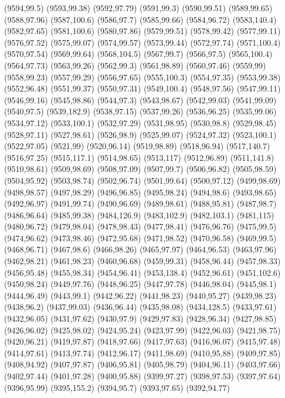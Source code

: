 (9594,99.5)
(9593,99.38)
(9592,97.79)
(9591,99.3)
(9590,99.51)
(9589,99.65)
(9588,97.96)
(9587,100.6)
(9586,97.7)
(9585,99.66)
(9584,96.72)
(9583,140.4)
(9582,97.65)
(9581,100.6)
(9580,97.86)
(9579,99.51)
(9578,99.42)
(9577,99.11)
(9576,97.52)
(9575,99.07)
(9574,99.57)
(9573,99.44)
(9572,97.74)
(9571,100.4)
(9570,97.54)
(9569,99.64)
(9568,104.5)
(9567,99.7)
(9566,97.5)
(9565,100.4)
(9564,97.73)
(9563,99.26)
(9562,99.3)
(9561,98.89)
(9560,97.46)
(9559,99)
(9558,99.23)
(9557,99.29)
(9556,97.65)
(9555,100.3)
(9554,97.35)
(9553,99.38)
(9552,96.48)
(9551,99.37)
(9550,97.31)
(9549,100.4)
(9548,97.56)
(9547,99.11)
(9546,99.16)
(9545,98.86)
(9544,97.3)
(9543,98.67)
(9542,99.03)
(9541,99.09)
(9540,97.5)
(9539,182.9)
(9538,97.15)
(9537,99.26)
(9536,96.25)
(9535,99.06)
(9534,97.12)
(9533,100.1)
(9532,97.29)
(9531,98.95)
(9530,98.8)
(9529,98.45)
(9528,97.11)
(9527,98.61)
(9526,98.9)
(9525,99.07)
(9524,97.32)
(9523,100.1)
(9522,97.05)
(9521,99)
(9520,96.14)
(9519,98.89)
(9518,96.94)
(9517,140.7)
(9516,97.25)
(9515,117.1)
(9514,98.65)
(9513,117)
(9512,96.89)
(9511,141.8)
(9510,98.61)
(9509,98.69)
(9508,97.09)
(9507,99.7)
(9506,96.82)
(9505,98.59)
(9504,95.92)
(9503,98.74)
(9502,96.74)
(9501,99.64)
(9500,97.12)
(9499,98.69)
(9498,98.57)
(9497,98.29)
(9496,96.85)
(9495,98.24)
(9494,98.6)
(9493,98.65)
(9492,96.97)
(9491,99.74)
(9490,96.69)
(9489,98.61)
(9488,95.81)
(9487,98.7)
(9486,96.64)
(9485,99.38)
(9484,126.9)
(9483,102.9)
(9482,103.1)
(9481,115)
(9480,96.72)
(9479,98.04)
(9478,98.43)
(9477,98.41)
(9476,96.76)
(9475,99.5)
(9474,96.62)
(9473,98.46)
(9472,95.68)
(9471,98.52)
(9470,96.58)
(9469,99.5)
(9468,96.71)
(9467,98.6)
(9466,98.26)
(9465,97.97)
(9464,96.53)
(9463,97.96)
(9462,98.21)
(9461,98.23)
(9460,96.68)
(9459,99.31)
(9458,96.44)
(9457,98.33)
(9456,95.48)
(9455,98.34)
(9454,96.41)
(9453,138.4)
(9452,96.61)
(9451,102.6)
(9450,98.24)
(9449,97.76)
(9448,96.25)
(9447,97.78)
(9446,98.04)
(9445,98.1)
(9444,96.49)
(9443,99.1)
(9442,96.22)
(9441,98.23)
(9440,95.27)
(9439,98.23)
(9438,96.2)
(9437,99.03)
(9436,96.44)
(9435,98.08)
(9434,128.5)
(9433,97.61)
(9432,96.05)
(9431,97.62)
(9430,97.9)
(9429,97.83)
(9428,96.34)
(9427,98.85)
(9426,96.02)
(9425,98.02)
(9424,95.24)
(9423,97.99)
(9422,96.03)
(9421,98.75)
(9420,96.21)
(9419,97.87)
(9418,97.66)
(9417,97.63)
(9416,96.07)
(9415,97.48)
(9414,97.61)
(9413,97.74)
(9412,96.17)
(9411,98.69)
(9410,95.88)
(9409,97.85)
(9408,94.92)
(9407,97.87)
(9406,95.81)
(9405,98.79)
(9404,96.11)
(9403,97.66)
(9402,97.44)
(9401,97.28)
(9400,95.88)
(9399,97.27)
(9398,97.53)
(9397,97.64)
(9396,95.99)
(9395,155.2)
(9394,95.7)
(9393,97.65)
(9392,94.77)
